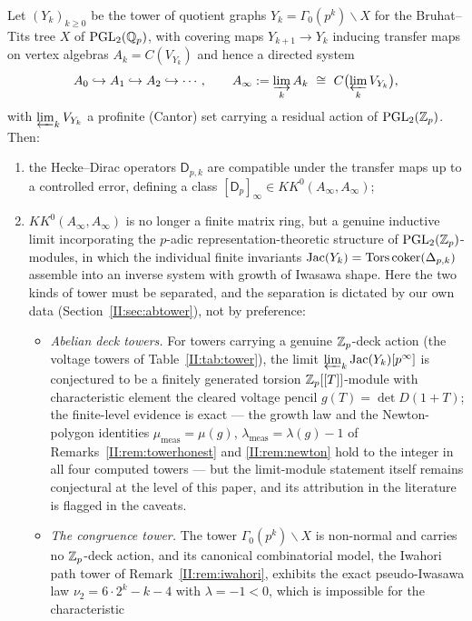 \begin{conjecture}\label{II:conj:tower}
Let $(Y_k)_{k\ge0}$ be the tower of quotient graphs $Y_k=\Gamma_0(p^k)\backslash X$ for
the Bruhat--Tits tree $X$ of $\mathrm{PGL}_2(\mathbb{Q}_p)$, with covering maps $Y_{k+1}\to Y_k$ inducing
transfer maps on vertex algebras $A_k=C(V_{Y_k})$ and hence a directed system
\[
A_0\hookrightarrow A_1\hookrightarrow A_2\hookrightarrow\cdots,\qquad
A_\infty:=\varinjlim_kA_k\ \cong\ C\bigl(\varprojlim_kV_{Y_k}\bigr),
\]
with $\varprojlim_kV_{Y_k}$ a profinite (Cantor) set carrying a residual action of
$\mathrm{PGL}_2(\mathbb{Z}_p)$. Then:
\begin{enumerate}
\item[(i)] the Hecke--Dirac operators $\mathsf D_{p,k}$ are compatible under the transfer
maps up to a controlled error, defining a class
$[\mathsf D_p]_\infty\in KK^0(A_\infty,A_\infty)$;
\item[(ii)] $KK^0(A_\infty,A_\infty)$ is no longer a finite matrix ring, but a genuine
inductive limit incorporating the $p$-adic representation-theoretic structure of
$\mathrm{PGL}_2(\mathbb{Z}_p)$-modules, in which the individual finite invariants
$\operatorname{Jac}(Y_k)=\operatorname{Tors}\operatorname{coker}(\Delta_{p,k})$ assemble into an inverse system with growth of
Iwasawa shape. Here the two kinds of tower must be separated, and the separation is
dictated by our own data (Section~\ref{II:sec:abtower}), not by preference:
\begin{itemize}
\item[(ii-a)] \emph{Abelian deck towers.} For towers carrying a genuine
$\mathbb{Z}_p$-deck action (the voltage towers of Table~\ref{II:tab:tower}), the limit
$\varprojlim_k\operatorname{Jac}(Y_k)[p^\infty]$ is conjectured to be a finitely generated torsion
$\mathbb{Z}_p[[T]]$-module with characteristic element the cleared voltage pencil
$g(T)=\det D(1+T)$; the finite-level evidence is exact --- the growth law and the
Newton-polygon identities $\mu_{\mathrm{meas}}=\mu(g)$,
$\lambda_{\mathrm{meas}}=\lambda(g)-1$ of Remarks~\ref{II:rem:towerhonest} and
\ref{II:rem:newton} hold to the integer in all four computed towers --- but the
limit-module statement itself remains conjectural at the level of this paper, and its
attribution in the literature is flagged in the caveats.
\item[(ii-b)] \emph{The congruence tower.} The tower $\Gamma_0(p^k)\backslash X$ is
non-normal and carries no $\mathbb{Z}_p$-deck action, and its canonical combinatorial model, the
Iwahori path tower of Remark~\ref{II:rem:iwahori}, exhibits the exact pseudo-Iwasawa law
$\nu_2=6\cdot2^k-k-4$ with $\lambda=-1<0$, which is impossible for the characteristic

\end{itemize}
\end{enumerate}
\end{conjecture}
